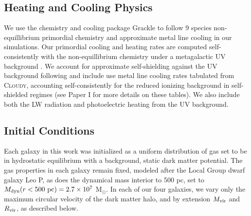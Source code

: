 \documentclass[twocolumn]{aastex61}
\begin{document}

\subsection{Heating and Cooling Physics}
\label{sec:heating and cooling}
We use the chemistry and cooling package Grackle \citep{GrackleMethod} to follow 9 species non-equillibrium primordial chemistry and approximate metal line cooling in our simulations. Our primordial cooling and heating rates are computed self-consistently with the non-equillibrium chemistry under a metagalactic UV background \citep{HM2012}. We account for approximate self-shielding against the UV background following \citep{Rahmati2013} and include use metal line cooling rates tabulated from \textsc{Cloudy}, accounting self-consistently for the reduced ionizing background in self-shielded regimes (see Paper I for more details on these tables). We also include both the LW radiation and photoelectric heating from the UV background.

\subsection{Initial Conditions}
\label{sec:IC}
Each galaxy in this work was initialized as a uniform distribution of gas set to be in hydrostatic equilibrium with a background, static dark matter potential. The gas properties in each galaxy remain fixed, modeled after the Local Group dwarf galaxy Leo P, as does the dynamical mass interior to 500 pc, set to $M_{\rm dyn} (r < 500~\rm{pc}) = 2.7\times 10^{7}$ M$_{\odot}$. In each of our four galaxies, we vary only the maximum circular velocity of the dark matter halo, and by extension $M_{\rm vir}$ and $R_{\rm vir}$, as described below.
\end{document}
